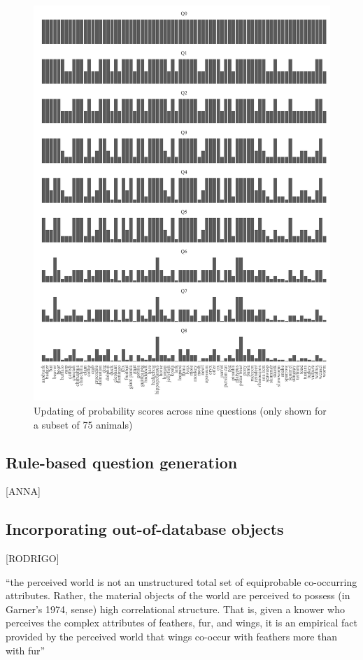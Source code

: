 \documentclass[11pt,a4paper]{article}
\begin{document}
\begin{figure}
	\includegraphics[width=\linewidth]{graphics/updating.pdf}
	\caption{Updating of probability scores across nine questions (only shown for a subset of 75 animals)}
	\label{fig:bayesian-update}
\end{figure}

\subsection{Rule-based question generation}
\label{subsec:qg}

[ANNA]


\subsection{Incorporating out-of-database objects}
\label{subsec:out-of-db}

[RODRIGO]

``the perceived world is not an unstructured total set of equiprobable co-occurring attributes. Rather, the material objects of the world are perceived to possess (in Garner's 1974, sense) high correlational structure.
That is, given a knower who perceives the complex attributes of feathers, fur, and wings, it is an empirical fact provided by the perceived world that wings co-occur with feathers more than with fur'' \citep[29]{Rosch1978}
\end{document}
